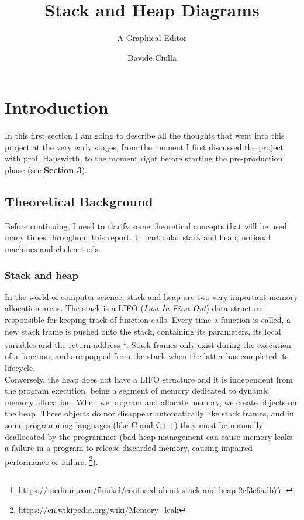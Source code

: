 \documentclass[]{usiinfbachelorproject}
\author{Davide Ciulla}
\title{Stack and Heap Diagrams}
\subtitle{A Graphical Editor}
\begin{document}
\maketitle


\tableofcontents
\newpage


\section{Introduction} \label{introduction}

In this first section I am going to describe all the thoughts that went into this project at the very early stages, from the moment I first discussed the project with prof. Hauswirth, to the moment right before starting the pre-production phase (see \hyperref[requirements+analysis]{\textbf{Section 3}}).

\subsection{Theoretical Background}

Before continuing, I need to clarify some theoretical concepts that will be used many times throughout this report. In particular stack and heap, notional machines and clicker tools.

\subsubsection{Stack and heap}
In the world of computer science, stack and heap are two very important memory allocation areas. The stack is a LIFO (\emph{Last In First Out}) data structure responsible for keeping track of function calls. Every time a function is called, a new stack frame is pushed onto the stack, containing its parameters, its local variables
 and the return address \footnote{\url{https://medium.com/fhinkel/confused-about-stack-and-heap-2cf3e6adb771}}. Stack frames only exist during the execution of a function, and are popped from the stack when the latter has completed its lifecycle.\\
 Conversely, the heap does not have a LIFO structure and it is independent from the program execution, being a segment of memory dedicated to dynamic memory allocation. When we program and allocate memory, we create objects on the heap. These objects do not disappear automatically like stack frames, and in some programming languages (like C and C++) they must be manually deallocated by the programmer (bad heap management can cause memory leaks - a failure in a program to release discarded memory, causing impaired performance or failure. \footnote {\url{https://en.wikipedia.org/wiki/Memory_leak}}).\\
 
\end{document}
